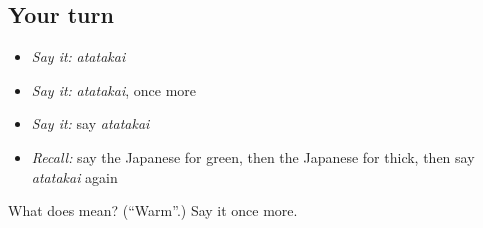 \subsection*{Your turn}
\begin{itemize}
\raggedright
  \item \emph{Say it:} \emph{atatakai}
  \item \emph{Say it:} \emph{atatakai}, once more
  \item \emph{Say it:} say \emph{atatakai}
  \item \emph{Recall:} say the Japanese for green, then the Japanese for thick, then say \emph{atatakai} again
\end{itemize}

\begin{tcolorbox}[breakable,colback=teal!4,colframe=teal!35!black,title={Before you move on}]
What does  mean? (\textquotedblleft{}Warm\textquotedblright{}.) Say it once more.
\end{tcolorbox}

